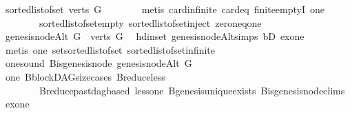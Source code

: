 \begin{isabellebody}
\ {\isachardoublequoteopen}sorted{\isacharunderscore}{\kern0pt}list{\isacharunderscore}{\kern0pt}of{\isacharunderscore}{\kern0pt}set\ {\isacharparenleft}{\kern0pt}verts\ G{\isacharparenright}{\kern0pt}\ {\isasymnoteq}\ {\isacharbrackleft}{\kern0pt}{\isacharbrackright}{\kern0pt}{\isachardoublequoteclose}\isanewline
\ \ \ \ \isamarkupfalse%
\ {\isacharparenleft}{\kern0pt}metis\ card{\isachardot}{\kern0pt}infinite\ card{\isacharunderscore}{\kern0pt}{}{\isacharunderscore}{\kern0pt}eq\ finite{\isachardot}{\kern0pt}emptyI\ one\ \isanewline
\ \ \ \ \ \ \ \ sorted{\isacharunderscore}{\kern0pt}list{\isacharunderscore}{\kern0pt}of{\isacharunderscore}{\kern0pt}set{\isacharunderscore}{\kern0pt}empty\ sorted{\isacharunderscore}{\kern0pt}list{\isacharunderscore}{\kern0pt}of{\isacharunderscore}{\kern0pt}set{\isacharunderscore}{\kern0pt}inject\ zero{\isacharunderscore}{\kern0pt}neq{\isacharunderscore}{\kern0pt}one{\isacharparenright}{\kern0pt}\ \isanewline
\ \ \isamarkupfalse%
\ \isamarkupfalse%
\ {\isachardoublequoteopen}genesis{\isacharunderscore}{\kern0pt}nodeAlt\ G\ {\isasymin}\ verts\ G{\isachardoublequoteclose}\ \isamarkupfalse%
\ hd{\isacharunderscore}{\kern0pt}in{\isacharunderscore}{\kern0pt}set\ genesis{\isacharunderscore}{\kern0pt}nodeAlt{\isachardot}{\kern0pt}simps\ bD\ exone\isanewline
\ \ \ \ \isamarkupfalse%
\ {\isacharparenleft}{\kern0pt}metis\ one\ set{\isacharunderscore}{\kern0pt}sorted{\isacharunderscore}{\kern0pt}list{\isacharunderscore}{\kern0pt}of{\isacharunderscore}{\kern0pt}set\ sorted{\isacharunderscore}{\kern0pt}list{\isacharunderscore}{\kern0pt}of{\isacharunderscore}{\kern0pt}set{\isachardot}{\kern0pt}infinite{\isacharparenright}{\kern0pt}\ \isanewline
\ \ \isamarkupfalse%
\ \isamarkupfalse%
\ one{\isacharunderscore}{\kern0pt}sound{\isacharcolon}{\kern0pt}\ {\isachardoublequoteopen}B{\isachardot}{\kern0pt}is{\isacharunderscore}{\kern0pt}genesis{\isacharunderscore}{\kern0pt}node\ {\isacharparenleft}{\kern0pt}genesis{\isacharunderscore}{\kern0pt}nodeAlt\ G{\isacharparenright}{\kern0pt}{\isachardoublequoteclose}\isanewline
\ \ \ \ \isamarkupfalse%
\ one\ B{\isachardot}{\kern0pt}blockDAG{\isacharunderscore}{\kern0pt}size{\isacharunderscore}{\kern0pt}cases\ B{\isachardot}{\kern0pt}reduce{\isacharunderscore}{\kern0pt}less\isanewline
\ \ \ \ \ \ \ \ B{\isachardot}{\kern0pt}reduce{\isacharunderscore}{\kern0pt}past{\isacharunderscore}{\kern0pt}dagbased\ less{\isacharunderscore}{\kern0pt}one\ B{\isachardot}{\kern0pt}genesis{\isacharunderscore}{\kern0pt}unique{\isacharunderscore}{\kern0pt}exists\ B{\isachardot}{\kern0pt}is{\isacharunderscore}{\kern0pt}genesis{\isacharunderscore}{\kern0pt}node{\isachardot}{\kern0pt}elims{\isacharparenleft}{\kern0pt}{}{\isacharparenright}{\kern0pt}\ exone\isanewline

\end{isabellebody}
